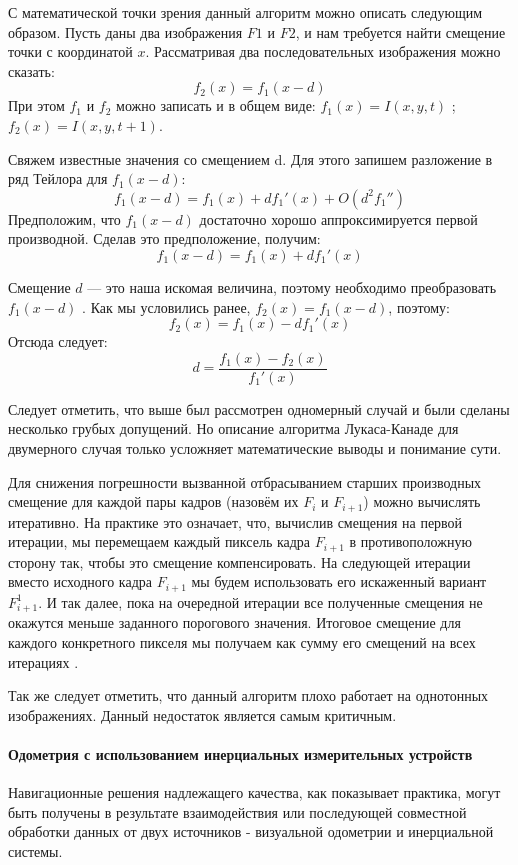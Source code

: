 С математической точки зрения данный алгоритм можно описать следующим образом.
Пусть даны два изображения $F1$ и $F2$, и нам требуется найти смещение точки с координатой $x$. Рассматривая два последовательных изображения можно сказать:
$$ f_2(x) = f_1 (x-d)$$
При этом $f_1$ и $f_2$ можно записать и в общем виде: $f_1(x) = I (x, y, t)$ ; $f_2(x) = I (x, y, t+1)$.

Свяжем известные значения со смещением d. Для этого запишем разложение в ряд Тейлора для $ f_1 (x-d)$:
$$  f_1 (x-d) =f_1(x) + df_1'(x) + O(d^2f_1'') $$
Предположим, что $ f_1 (x-d)$ достаточно хорошо аппроксимируется первой производной. Сделав это предположение, получим:
$$  f_1 (x-d) =f_1(x) + df_1'(x) $$

Смещение $d$ — это наша искомая величина, поэтому необходимо преобразовать $ f_1 (x-d)$ . Как мы условились ранее, $ f_2(x) = f_1 (x-d) $, поэтому:
$$ f_2(x)= f_1(x) - df_1'(x) $$
Отсюда следует:
$$ d = \frac{f_1(x)-f_2(x)}{f_1'(x)} $$

Следует отметить, что выше был рассмотрен одномерный случай и были сделаны несколько грубых допущений. Но описание алгоритма Лукаса-Канаде для двумерного случая только усложняет математические выводы и понимание сути. 

Для снижения погрешности вызванной отбрасыванием старших производных смещение для каждой пары кадров (назовём их $F_i$ и $F_{i+1}$) можно вычислять итеративно. На практике это означает, что, вычислив смещения на первой итерации, мы перемещаем каждый пиксель кадра $F_{i+1}$ в противоположную сторону так, чтобы это смещение компенсировать. На следующей итерации вместо исходного кадра $F_{i+1}$ мы будем использовать его искаженный вариант $F_{i+1}^1$. И так далее, пока на очередной итерации все полученные смещения не окажутся меньше заданного порогового значения. Итоговое смещение для каждого конкретного пикселя мы получаем как сумму его смещений на всех итерациях \cite{habrOpticalFlowTheory}.

Так же следует отметить, что данный алгоритм плохо работает на однотонных изображениях. Данный недостаток является самым критичным. 

\paragraph{Одометрия с использованием инерциальных измерительных устройств}
Навигационные решения надлежащего качества, как показывает практика, могут быть получены в результате взаимодействия или последующей совместной обработки данных от двух источников - визуальной одометрии и инерциальной системы. 

